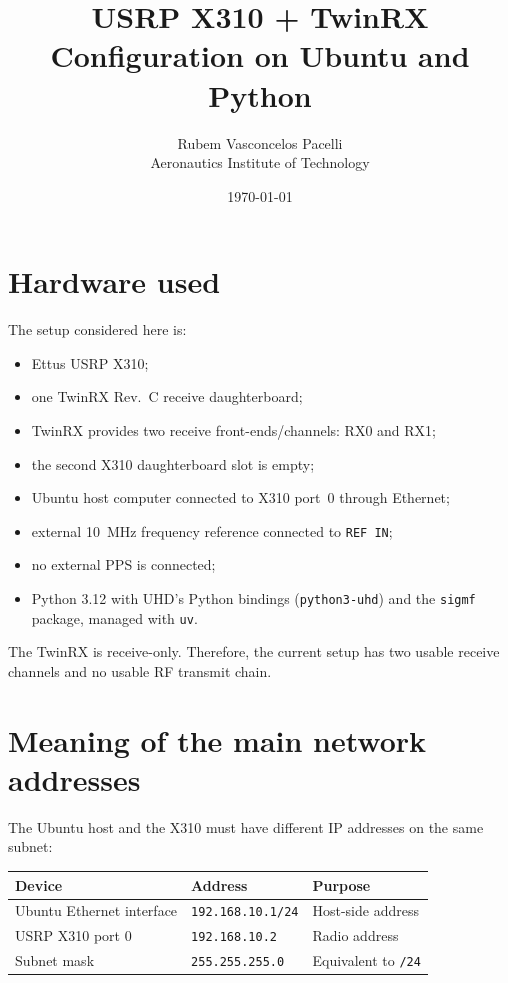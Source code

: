 \documentclass[11pt,a4paper]{article}
\title{USRP X310 + TwinRX Configuration on Ubuntu and Python}
\author{Rubem Vasconcelos  Pacelli \\ Aeronautics Institute of Technology}
\date{\today}
\begin{document}
\maketitle

\section{Hardware used}

The setup considered here is:

\begin{itemize}[leftmargin=*]
    \item Ettus USRP X310;
    \item one TwinRX Rev.~C receive daughterboard;
    \item TwinRX provides two receive front-ends/channels: RX0 and RX1;
    \item the second X310 daughterboard slot is empty;
    \item Ubuntu host computer connected to X310 port~0 through Ethernet;
    \item external 10~MHz frequency reference connected to \texttt{REF IN};
    \item no external PPS is connected;
    \item Python 3.12 with UHD's Python bindings (\texttt{python3-uhd}) and the \texttt{sigmf} package, managed with \texttt{uv}.
\end{itemize}

The TwinRX is receive-only. Therefore, the current setup has two usable receive channels and no usable RF transmit chain.

\section{Meaning of the main network addresses}

The Ubuntu host and the X310 must have different IP addresses on the same subnet:

\begin{center}
\begin{tabular}{lll}
\toprule
Device & Address & Purpose \\
\midrule
Ubuntu Ethernet interface & \texttt{192.168.10.1/24} & Host-side address \\
USRP X310 port 0 & \texttt{192.168.10.2} & Radio address \\
Subnet mask & \texttt{255.255.255.0} & Equivalent to \texttt{/24} \\
\bottomrule
\end{tabular}
\end{center}
\end{document}
